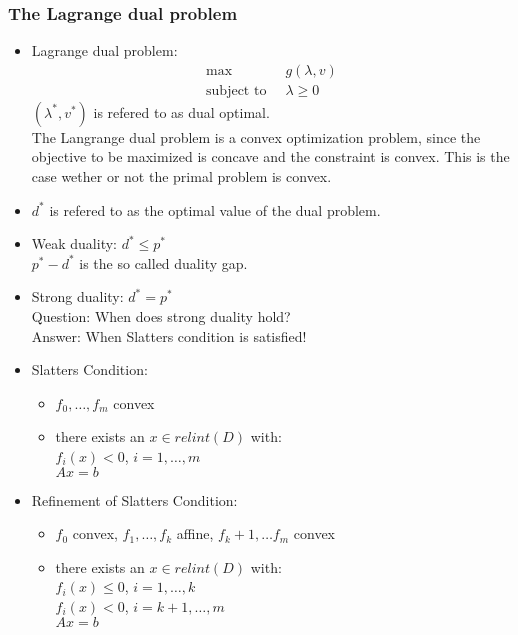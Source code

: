 \documentclass{scrartcl}
\begin{document}
\subsubsection{The Lagrange dual problem}
\begin{itemize}
    \item
        Lagrange dual problem:
        \begin{align*}
            \max\;\; & g(\lambda, v)\\
						\text{subject to} \; \; & \lambda \geq 0
        \end{align*}
        $(\lambda^*, v^*)$ is refered to as dual optimal.\\
        The Langrange dual problem is a convex optimization problem, since the objective to be maximized is concave and the constraint is convex. This is the case wether or not the primal problem is convex.
    \item
        $d^*$ is refered to as the optimal value of the dual problem. 
    \item     
        Weak duality: $d^* \leq p^*$\\
        $p^* - d^*$ is the so called duality gap.
    \item
        Strong duality: $d^* = p^*$\\
        Question: When does strong duality hold?\\
        Answer: When Slatters condition is satisfied!
    \item
        Slatters Condition:
        \begin{itemize}
            \item
                $f_0,\dots,f_m$ convex
            \item
                there exists an $x \in relint(D)$ with:\\
                $f_i(x) < 0$, $i=1,\dots,m$\\
                $Ax = b$
        \end{itemize}
    \item
        Refinement of Slatters Condition:
        \begin{itemize}
            \item
                $f_0$ convex, $f_1, \dots, f_k$ affine, $f_k+1, \dots f_m$ convex
            \item
                there exists an $x \in relint(D)$ with:\\
                $f_i(x) \leq 0$, $i=1,\dots, k$\\
                $f_i(x) < 0$, $i=k+1, \dots, m$\\
                $Ax = b$
                
        \end{itemize}
\end{itemize}
\end{document}
